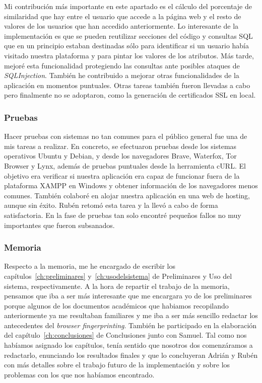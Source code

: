 Mi contribución más importante en este apartado es el cálculo del porcentaje de similaridad que hay entre el usuario que accede a la página web y el resto de valores de los usuarios que han accedido anteriormente. Lo interesante de la implementación es que se pueden reutilizar secciones del código y consultas SQL que en un principio estaban destinadas sólo para identificar si un usuario había visitado nuestra plataforma y para pintar los valores de los atributos. Más tarde, mejoré esta funcionalidad protegiendo las consultas ante posibles ataques de \textit{SQLInjection}. También he contribuido a mejorar otras funcionalidades de la aplicación en momentos puntuales. Otras tareas también fueron llevadas a cabo pero finalmente no se adoptaron, como la generación de certificados SSL en local. \par 

\subsubsection{Pruebas}

Hacer pruebas con sistemas no tan comunes para el público general fue una de mis tareas a realizar. En concreto, se efectuaron pruebas desde los sistemas operativos Ubuntu y Debian, y desde los navegadores Brave, Waterfox, Tor Browser y Lynx, además de pruebas puntuales desde la herramienta cURL. El objetivo era verificar si nuestra aplicación era capaz de funcionar fuera de la plataforma XAMPP en Windows y obtener información de los navegadores menos comunes. También colaboré en alojar nuestra aplicación en una web de hosting, aunque sin éxito. Rubén retomó esta tarea y la llevó a cabo de forma satisfactoria. En la fase de pruebas tan solo encontré pequeños fallos no muy importantes que fueron subsanados.

\subsubsection{Memoria}

Respecto a la memoria, me he encargado de escribir los capítulos~\ref{ch:preliminares} y~\ref{ch:usodelsistema} de Preliminares y Uso del sistema, respectivamente. A la hora de repartir el trabajo de la memoria, pensamos que iba a ser más interesante que me encargara yo de los preliminares porque algunos de los documentos académicos que habiamos recopilando anteriormente ya me resultaban familiares y me iba a ser más sencillo redactar los antecedentes del \textit{browser fingerprinting}. También he participado en la elaboración del capítulo~\ref{ch:conclusiones} de Conclusiones junto con Samuel. Tal como nos habíamos asignado los capítulos, tenía sentido que nosotros dos comenzáramos a redactarlo, enunciando los resultados finales y que lo concluyeran Adrián y Rubén con más detalles sobre el trabajo futuro de la implementación y sobre los problemas con los que nos habíamos encontrado. \par 

